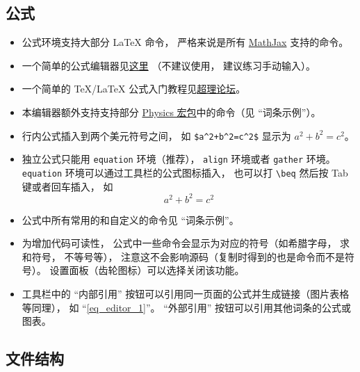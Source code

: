 \subsection{公式}
\begin{itemize}
\item 公式环境支持大部分 LaTeX 命令， 严格来说是所有 \href{https://www.mathjax.org/}{MathJax} 支持的命令。
\item 一个简单的公式编辑器见\href{https://www.codecogs.com/latex/eqneditor.php}{这里} （不建议使用， 建议练习手动输入）。
\item 一个简单的 TeX/LaTeX 公式入门教程见\href{https://chaoli.club/index.php/211}{超理论坛}。
\item 本编辑器额外支持支持部分 \href{http://mirrors.ibiblio.org/CTAN/macros/latex/contrib/physics/physics.pdf}{Physics 宏包}中的命令（见 “词条示例”）。
\item 行内公式插入到两个美元符号之间， 如 \verb|$a^2+b^2=c^2$| 显示为 $a^2 + b^2 = c^2$。
\item 独立公式只能用 \verb|equation| 环境（推荐）， \verb|align| 环境或者 \verb|gather| 环境。 \verb|equation| 环境可以通过工具栏的公式图标插入， 也可以打 \verb|\beq| 然后按 Tab 键或者回车插入， 如
\begin{equation}\label{eq_editor_1}
a^2 + b^2 = c^2
\end{equation}
\item 公式中所有常用的和自定义的命令见 “词条示例”。
\item 为增加代码可读性， 公式中一些命令会显示为对应的符号（如希腊字母， 求和符号， 不等号等）， 注意这不会影响源码（复制时得到的也是命令而不是符号）。 设置面板（齿轮图标）可以选择关闭该功能。
\item 工具栏中的 “内部引用” 按钮可以引用同一页面的公式并生成链接（图片表格等同理）， 如 “\autoref{eq_editor_1}”。 “外部引用” 按钮可以引用其他词条的公式或图表。
\end{itemize}

\subsection{文件结构}

